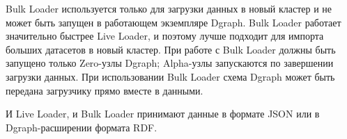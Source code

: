 Bulk Loader используется только для загрузки данных в новый кластер и не может быть
запущен в работающем экземпляре Dgraph. Bulk Loader работает значительно быстрее Live Loader,
и поэтому лучше подходит для импорта больших датасетов в новый кластер. При работе с Bulk Loader
должны быть запущено только Zero-узлы Dgraph; Alpha-узлы запускаются по завершении загрузки данных. 
При использовании Bulk Loader схема Dgraph может быть передана загрузчику прямо вместе в данными.

И Live Loader, и Bulk Loader принимают данные в формате JSON или в Dgraph-расширении формата RDF.

